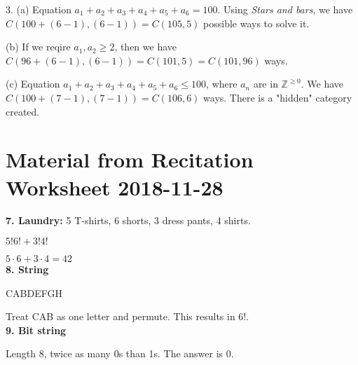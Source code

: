 \documentclass[english,openany]{book}
\begin{document}
    3. (a) Equation $a_1 + a_2 + a_3 + a_4 + a_5 + a_6 = 100$. Using \textit{Stars and bars}, we have $C(100+(6-1), (6-1)) = C(105, 5)$ possible ways to solve it.

    (b) If we reqire $a_1, a_2 \geq 2$, then we have $C(96+(6-1), (6-1)) = C(101,5) = C(101, 96)$ ways.

    (c) Equation $a_1 + a_2 + a_3 + a_4 + a_5 + a_6 \leq 100$, where $a_n$ are in $\mathbb Z^{\geq 0}$. We have $C(100+(7-1), (7-1)) = C(106,6)$ ways. There is a "hidden" category created.\\

    \section{Material from Recitation Worksheet 2018-11-28}

    \textbf{7. Laundry:} 5 T-shirts, 6 shorts, 3 dress pants, 4 shirts.

    $5!6! + 3!4!$

    $5 \cdot 6 + 3 \cdot 4 = 42$\\

    \textbf{8. String}

    CABDEFGH

    Treat CAB as one letter and permute. This results in $6!$.\\

    \textbf{9. Bit string}

    Length 8, twice as many 0s than 1s. The answer is 0.
\end{document}
